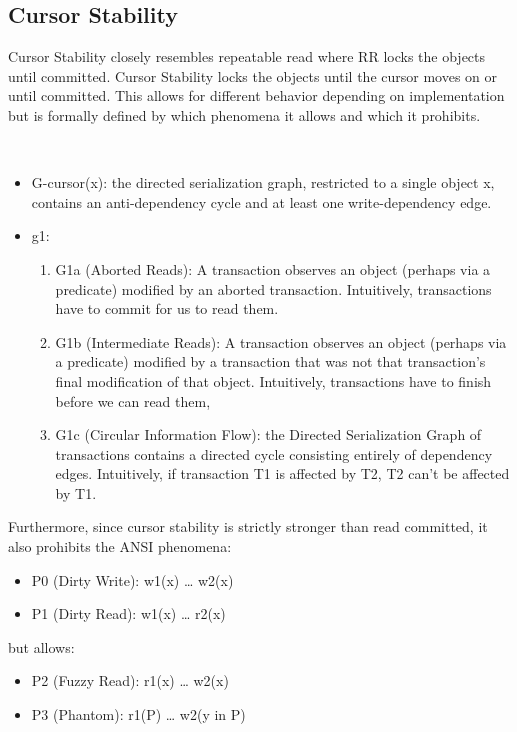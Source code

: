 \documentclass[a4paper,10pt,titlepage]{report}
\begin{document}
    \subsection{Cursor Stability}
    Cursor Stability closely resembles repeatable read where RR locks the objects until committed. Cursor Stability locks the objects until the cursor moves on or until committed. This allows for different behavior depending on implementation but is formally defined by which phenomena it allows and which it prohibits.

    \cite{Adya99weakconsistency}\\
    \begin{itemize}
        \item G-cursor(x): the directed serialization graph, restricted to a single object x, contains an anti-dependency cycle and at least one write-dependency edge.
        \item g1:
        \begin{enumerate}
            \item G1a (Aborted Reads): A transaction observes an object (perhaps via a predicate) modified by an aborted transaction. Intuitively, transactions have to commit for us to read them.
            \item G1b (Intermediate Reads): A transaction observes an object (perhaps via a predicate) modified by a transaction that was not that transaction's final modification of that object. Intuitively, transactions have to finish before we can read them,
            \item G1c (Circular Information Flow): the Directed Serialization Graph of transactions contains a directed cycle consisting entirely of dependency edges. Intuitively, if transaction T1 is affected by T2, T2 can't be affected by T1.
        \end{enumerate}
    \end{itemize}
    Furthermore, since cursor stability is strictly stronger than read committed, it also prohibits the ANSI phenomena:
    \begin{itemize}
        \item P0 (Dirty Write): w1(x) … w2(x)
        \item P1 (Dirty Read): w1(x) … r2(x)
    \end{itemize}

    but allows:
    \begin{itemize}
        \item P2 (Fuzzy Read): r1(x) … w2(x)
        \item P3 (Phantom): r1(P) … w2(y in P)
    \end{itemize}
\end{document}
